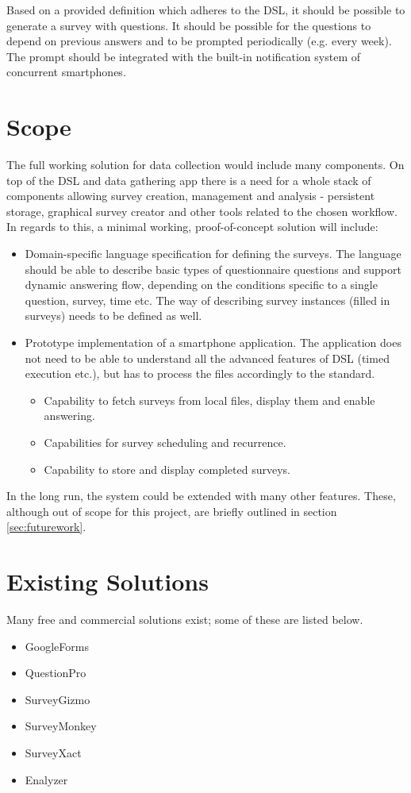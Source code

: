 Based on a provided definition which adheres to the DSL, it should be possible to generate a survey with questions. It should be possible for the questions to depend on previous answers and to be prompted periodically (e.g. every week). The prompt should be integrated with the built-in notification system of concurrent smartphones.

\section{Scope}
\label{sec:scope}
The full working solution for data collection would include many components. On top of the DSL and data gathering app there is a need for a whole stack of components allowing survey creation, management and analysis - persistent storage, graphical survey creator and other tools related to the chosen workflow. In regards to this, a minimal working, proof-of-concept solution will include:

\begin{itemize}
\item Domain-specific language specification for defining the surveys. The language should be able to describe basic types of questionnaire questions and support dynamic answering flow, depending on the conditions specific to a single question, survey, time etc. The way of describing survey instances (filled in surveys) needs to be defined as well.
\item Prototype implementation of a smartphone application. The application does not need to be able to understand all the advanced features of DSL (timed execution etc.), but has to process the files accordingly to the standard.
	\begin{itemize}
		\item Capability to fetch surveys from local files, display them and enable answering.
		\item Capabilities for survey scheduling and recurrence.
		\item Capability to store and display completed surveys.
	\end{itemize}
\end{itemize}

In the long run, the system could be extended with many other features. These, although out of scope for this project, are briefly outlined in section \ref{sec:futurework}.

\section{Existing Solutions}
\label{sec:existingsolutions}
Many free and commercial solutions exist; some of these are listed below.
\begin{itemize}
\item GoogleForms
\item QuestionPro
\item SurveyGizmo
\item SurveyMonkey
\item SurveyXact
\item Enalyzer
\end{itemize}
  
